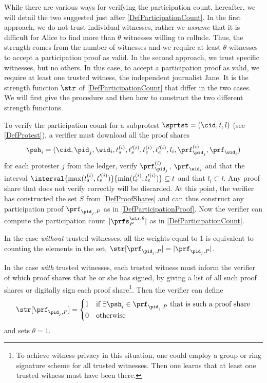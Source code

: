 While there are various ways for verifying the participation count, hereafter, 
we will detail the two suggested just after \cref{DefParticipationCount}.
In the first approach, we do not trust individual witnesses, rather we \emph{assume} that it is difficult for Alice to find more than \(\theta\) witnesses willing to collude.
Thus, the strength comes from the number of witnesses and we require at least \(\theta\) witnesses to accept a participation proof as valid.
In the second approach, we trust specific witnesses, but no others.
In this case, to accept a participation proof as valid, we require at least one trusted witness, the independent journalist Jane.
It is the strength function \(\str\) of \cref{DefParticipationCount} that 
differ in the two cases.
We will first give the procedure and then how to construct the two different 
strength functions.

To verify the participation count for a subprotest \(\sprtst = (\cid, t, l)\) 
(see \cref{DefProtest}), a verifier must download all the proof shares \[
  \psh_i =   (\cid, \pid_j, \wid_i, t_s^{(i)}, t_s^{\prime (i)}, t_e^{(i)}, 
  t_e^{\prime   (i)}, l_i, \prf_{\pid_j}^{(i)}, \prf_{\wid_i})
\] for each protester \(j\) from the ledger, verify \(\prf_{\pid_j}^{(i)}\), 
\(\prf_{\wid_i}\) and that the interval \(\interval{\max(t_s^{(i)}, t_s^{\prime 
      (i)})}{\min(t_e^{(i)}, t_e^{\prime (i)})}\subseteq t\) and that 
\(l_i\subseteq  l\).
Any proof share that does not verify correctly will be discarded.
At this point, the verifier has constructed the set \(S\) from 
\cref{DefProofShares} and can thus construct any participation proof 
\(\prf_{\pid_j, P}\) as in \cref{DefParticipationProof}.
Now the verifier can compute the participation count \(|\prfs_P^{\str, 
    \theta}|\) as in \cref{DefParticipationCount}.

In the case \emph{without} trusted witnesses, all the weights equal to 1 is equivalent to counting the elements in the set, 
\(\str[\prf_{\pid_j, P}] = |\prf_{\pid_j, P}|\).

In the case \emph{with} trusted witnesses, each trusted witness must inform the 
verifier of which proof shares that he or she has signed, \eg by giving a list 
of all such proof shares or digitally sign each proof share\footnote{%
  To achieve witness privacy in this situation, one could employ a group or 
  ring signature scheme for all trusted witnesses.
  Then one learns that at least one trusted witness must have been there.
}.
Then the verifier can define \[
  \str[\prf_{\pid_j, P}] = \begin{cases}
    1 & \text{if \(\exists \psh_i\in \prf_{\pid_j, P}\) that is such a proof 
      share} \\
    0 & \text{otherwise}
  \end{cases}
\] and sets \(\theta = 1\).
